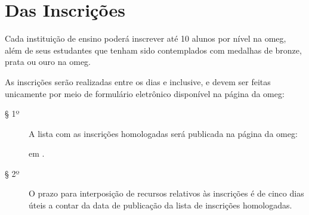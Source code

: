\section*{Das Inscrições}

\begin{article}
  Cada instituição de ensino poderá inscrever até 10 alunos por nível na
  \currentEdition{} \acrshort{omeg}, além de seus estudantes que tenham sido
  contemplados com medalhas de bronze, prata ou ouro na \previousEdition{}
  \acrshort{omeg}.
\end{article}

\begin{article}
  As inscrições serão realizadas entre os dias \registrationOpening{} e
  \registrationClosing{} inclusive, e devem ser feitas unicamente por meio de
  formulário eletrônico disponível na página da \acrshort{omeg}:
  \begin{center}
    \homepage
  \end{center}
  \begin{description}
    \item[§ 1º]
      A lista com as inscrições homologadas será publicada na página da
      \acrshort{omeg}:
      \begin{center}
        \homepage
      \end{center}
      em \publicationOfAprovedRegistrations{}.
    \item[§ 2º]
      O prazo para interposição de recursos relativos às inscrições é de cinco
      dias úteis a contar da data de publicação da lista de inscrições
      homologadas.
  \end{description}
\end{article}

